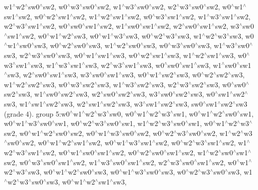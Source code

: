 w1$^\wedge$w2$^\wedge$sw0$^\wedge$sw2, w0$^\wedge$w3$^\wedge$sw0$^\wedge$sw2, w1$^\wedge$w3$^\wedge$sw0$^\wedge$sw2, w2$^\wedge$w3$^\wedge$sw0$^\wedge$sw2, w0$^\wedge$w1$^\wedge$sw1$^\wedge$sw2, w0$^\wedge$w2$^\wedge$sw1$^\wedge$sw2, w1$^\wedge$w2$^\wedge$sw1$^\wedge$sw2, w0$^\wedge$w3$^\wedge$sw1$^\wedge$sw2, w1$^\wedge$w3$^\wedge$sw1$^\wedge$sw2, w2$^\wedge$w3$^\wedge$sw1$^\wedge$sw2, w0$^\wedge$sw0$^\wedge$sw1$^\wedge$sw2, w1$^\wedge$sw0$^\wedge$sw1$^\wedge$sw2, w2$^\wedge$sw0$^\wedge$sw1$^\wedge$sw2, w3$^\wedge$sw0$^\wedge$sw1$^\wedge$sw2, w0$^\wedge$w1$^\wedge$w2$^\wedge$sw3, w0$^\wedge$w1$^\wedge$w3$^\wedge$sw3, w0$^\wedge$w2$^\wedge$w3$^\wedge$sw3, w1$^\wedge$w2$^\wedge$w3$^\wedge$sw3, w0$^\wedge$w1$^\wedge$sw0$^\wedge$sw3, w0$^\wedge$w2$^\wedge$sw0$^\wedge$sw3, w1$^\wedge$w2$^\wedge$sw0$^\wedge$sw3, w0$^\wedge$w3$^\wedge$sw0$^\wedge$sw3, w1$^\wedge$w3$^\wedge$sw0$^\wedge$sw3, w2$^\wedge$w3$^\wedge$sw0$^\wedge$sw3, w0$^\wedge$w1$^\wedge$sw1$^\wedge$sw3, w0$^\wedge$w2$^\wedge$sw1$^\wedge$sw3, w1$^\wedge$w2$^\wedge$sw1$^\wedge$sw3, w0$^\wedge$w3$^\wedge$sw1$^\wedge$sw3, w1$^\wedge$w3$^\wedge$sw1$^\wedge$sw3, w2$^\wedge$w3$^\wedge$sw1$^\wedge$sw3, w0$^\wedge$sw0$^\wedge$sw1$^\wedge$sw3, w1$^\wedge$sw0$^\wedge$sw1$^\wedge$sw3, w2$^\wedge$sw0$^\wedge$sw1$^\wedge$sw3, w3$^\wedge$sw0$^\wedge$sw1$^\wedge$sw3, w0$^\wedge$w1$^\wedge$sw2$^\wedge$sw3, w0$^\wedge$w2$^\wedge$sw2$^\wedge$sw3, w1$^\wedge$w2$^\wedge$sw2$^\wedge$sw3, w0$^\wedge$w3$^\wedge$sw2$^\wedge$sw3, w1$^\wedge$w3$^\wedge$sw2$^\wedge$sw3, w2$^\wedge$w3$^\wedge$sw2$^\wedge$sw3, w0$^\wedge$sw0$^\wedge$sw2$^\wedge$sw3, w1$^\wedge$sw0$^\wedge$sw2$^\wedge$sw3, w2$^\wedge$sw0$^\wedge$sw2$^\wedge$sw3, w3$^\wedge$sw0$^\wedge$sw2$^\wedge$sw3, w0$^\wedge$sw1$^\wedge$sw2$^\wedge$sw3, w1$^\wedge$sw1$^\wedge$sw2$^\wedge$sw3, w2$^\wedge$sw1$^\wedge$sw2$^\wedge$sw3, w3$^\wedge$sw1$^\wedge$sw2$^\wedge$sw3, sw0$^\wedge$sw1$^\wedge$sw2$^\wedge$sw3 (grade 4). group 5\-:w0$^\wedge$w1$^\wedge$w2$^\wedge$w3$^\wedge$sw0, w0$^\wedge$w1$^\wedge$w2$^\wedge$w3$^\wedge$sw1, w0$^\wedge$w1$^\wedge$w2$^\wedge$sw0$^\wedge$sw1, w0$^\wedge$w1$^\wedge$w3$^\wedge$sw0$^\wedge$sw1, w0$^\wedge$w2$^\wedge$w3$^\wedge$sw0$^\wedge$sw1, w1$^\wedge$w2$^\wedge$w3$^\wedge$sw0$^\wedge$sw1, w0$^\wedge$w1$^\wedge$w2$^\wedge$w3$^\wedge$sw2, w0$^\wedge$w1$^\wedge$w2$^\wedge$sw0$^\wedge$sw2, w0$^\wedge$w1$^\wedge$w3$^\wedge$sw0$^\wedge$sw2, w0$^\wedge$w2$^\wedge$w3$^\wedge$sw0$^\wedge$sw2, w1$^\wedge$w2$^\wedge$w3$^\wedge$sw0$^\wedge$sw2, w0$^\wedge$w1$^\wedge$w2$^\wedge$sw1$^\wedge$sw2, w0$^\wedge$w1$^\wedge$w3$^\wedge$sw1$^\wedge$sw2, w0$^\wedge$w2$^\wedge$w3$^\wedge$sw1$^\wedge$sw2, w1$^\wedge$w2$^\wedge$w3$^\wedge$sw1$^\wedge$sw2, w0$^\wedge$w1$^\wedge$sw0$^\wedge$sw1$^\wedge$sw2, w0$^\wedge$w2$^\wedge$sw0$^\wedge$sw1$^\wedge$sw2, w1$^\wedge$w2$^\wedge$sw0$^\wedge$sw1$^\wedge$sw2, w0$^\wedge$w3$^\wedge$sw0$^\wedge$sw1$^\wedge$sw2, w1$^\wedge$w3$^\wedge$sw0$^\wedge$sw1$^\wedge$sw2, w2$^\wedge$w3$^\wedge$sw0$^\wedge$sw1$^\wedge$sw2, w0$^\wedge$w1$^\wedge$w2$^\wedge$w3$^\wedge$sw3, w0$^\wedge$w1$^\wedge$w2$^\wedge$sw0$^\wedge$sw3, w0$^\wedge$w1$^\wedge$w3$^\wedge$sw0$^\wedge$sw3, w0$^\wedge$w2$^\wedge$w3$^\wedge$sw0$^\wedge$sw3, w1$^\wedge$w2$^\wedge$w3$^\wedge$sw0$^\wedge$sw3, w0$^\wedge$w1$^\wedge$w2$^\wedge$sw1$^\wedge$sw3, 